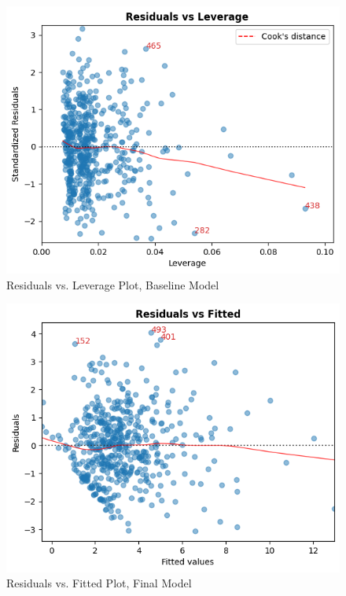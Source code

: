 \documentclass[10pt]{article}
\begin{document}
\begin{figure}[H]
\centering
	\centerline{\includegraphics[width=\columnwidth]{baseline_residuals_vs_leverage}}
	\caption{Residuals vs. Leverage Plot, Baseline Model\label{baseline_residuals_vs_leverage}}
\end{figure}









\begin{figure}[H]
\centering
	\centerline{\includegraphics[width=\columnwidth]{final_residuals_vs_fitted}}
	\caption{Residuals vs. Fitted Plot, Final Model\label{final_residuals_vs_fitted}}
\end{figure}
\end{document}
